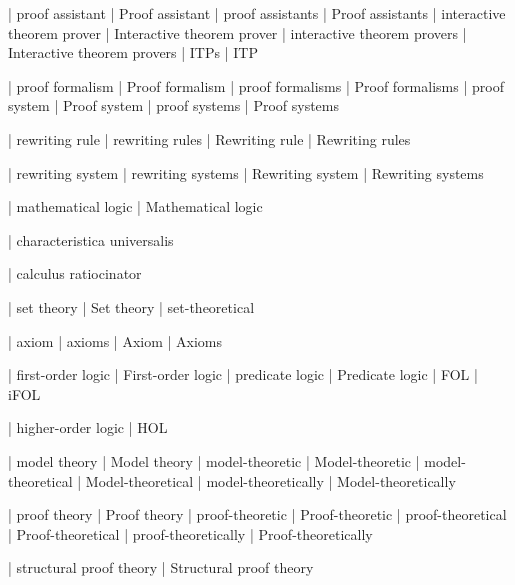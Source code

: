 


 | proof assistant
 | Proof assistant
 | proof assistants
 | Proof assistants
 | interactive theorem prover
 | Interactive theorem prover
 | interactive theorem provers
 | Interactive theorem provers
 | ITPs
 | ITP

 | proof formalism
 | Proof formalism
 | proof formalisms
 | Proof formalisms
 | proof system
 | Proof system
 | proof systems
 | Proof systems

 | rewriting rule
 | rewriting rules
 | Rewriting rule
 | Rewriting rules

 | rewriting system
 | rewriting systems
 | Rewriting system
 | Rewriting systems

 | mathematical logic
 | Mathematical logic

 | characteristica universalis

 | calculus ratiocinator
 
 | set theory
 | Set theory
 | set-theoretical

 | axiom
 | axioms
 | Axiom
 | Axioms

 | first-order logic
 | First-order logic
 | predicate logic
 | Predicate logic
 | FOL
 | iFOL
 
 | higher-order logic
 | HOL

 | model theory
 | Model theory
 | model-theoretic
 | Model-theoretic
 | model-theoretical
 | Model-theoretical
 | model-theoretically
 | Model-theoretically

 | proof theory
 | Proof theory
 | proof-theoretic
 | Proof-theoretic
 | proof-theoretical
 | Proof-theoretical
 | proof-theoretically
 | Proof-theoretically

 | structural proof theory
 | Structural proof theory

